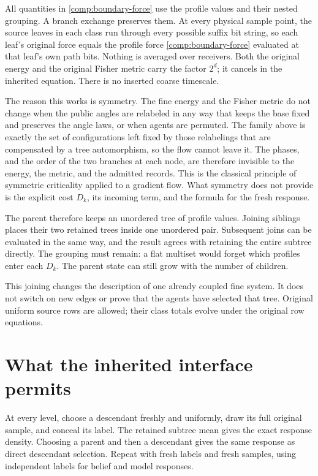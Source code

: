All quantities in \cref{comp:boundary-force} use the profile values and their nested grouping. A branch exchange preserves them. At every physical sample point, the source leaves in each class run through every possible suffix bit string, so each leaf's original force equals the profile force \cref{comp:boundary-force} evaluated at that leaf's own path bits. Nothing is averaged over receivers. Both the original energy and the original Fisher metric carry the factor $2^d$; it cancels in the inherited equation. There is no inserted coarse timescale.

The reason this works is symmetry. The fine energy and the Fisher metric do not change when the public angles are relabeled in any way that keeps the base fixed and preserves the angle laws, or when agents are permuted. The family above is exactly the set of configurations left fixed by those relabelings that are compensated by a tree automorphism, so the flow cannot leave it. The phases, and the order of the two branches at each node, are therefore invisible to the energy, the metric, and the admitted records. This is the classical principle of symmetric criticality applied to a gradient flow. What symmetry does not provide is the explicit cost $D_k$, its incoming term, and the formula for the fresh response.

The parent therefore keeps an unordered tree of profile values. Joining siblings places their two retained trees inside one unordered pair. Subsequent joins can be evaluated in the same way, and the result agrees with retaining the entire subtree directly. The grouping must remain: a flat multiset would forget which profiles enter each $D_k$. The parent state can still grow with the number of children.

This joining changes the description of one already coupled fine system. It does not switch on new edges or prove that the agents have selected that tree. Original uniform source rows are allowed; their class totals evolve under the original row equations.

\section{What the inherited interface permits}

At every level, choose a descendant freshly and uniformly, draw its full original sample, and conceal its label. The retained subtree mean gives the exact response density. Choosing a parent and then a descendant gives the same response as direct descendant selection. Repeat with fresh labels and fresh samples, using independent labels for belief and model responses.

